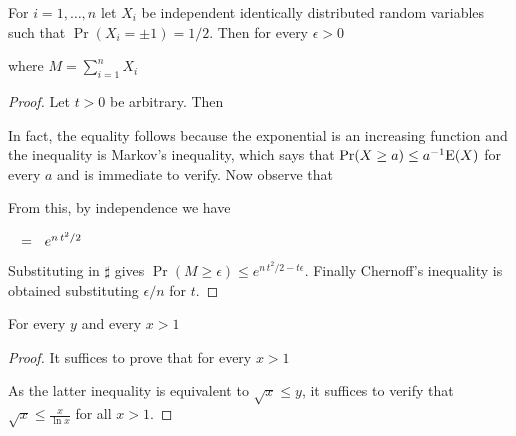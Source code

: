 \documentclass[sputnik.tex]{subfiles}
\begin{document}
\begin{lemma}\label{Chernoff}
For $i=1,\dots,n$ let $X_i$ be independent identically distributed random variables such that\/ $\Pr(X_i=\pm1)=1/2$.
Then for every $\epsilon>0$

\hfill where $\displaystyle M=\sum^n_{i=1}X_i$
\end{lemma}
\begin{proof}
Let $t>0$ be arbitrary.
Then



In fact, the equality follows because the exponential is an increasing function and the inequality is Markov's inequality, which says that $\Pr(X\ge a)\le a^{-1}{\rm E}(X)$ for every $a$ and is immediate to verify.
Now observe that






From this, by independence we have 

$\medrel{=}e^{n\,t^2/2}$

Substituting in $\sharp$ gives $\Pr(M\ge\epsilon)\le e^{n\,t^2/2-t\epsilon}$.
Finally Chernoff's inequality is obtained substituting $\epsilon/n$ for $t$.
\end{proof}

\begin{proposition}\label{prop_disequazione}
For every $y$ and every $x>1$

\end{proposition}
\begin{proof}
It suffices to prove that for  every $x>1$


As the latter inequality is equivalent to $\sqrt{x}\le y$, it suffices to verify that $\sqrt{x}\le\displaystyle\frac{x}{\ln x}$ for all $x>1$.
\end{proof}
\end{document}
